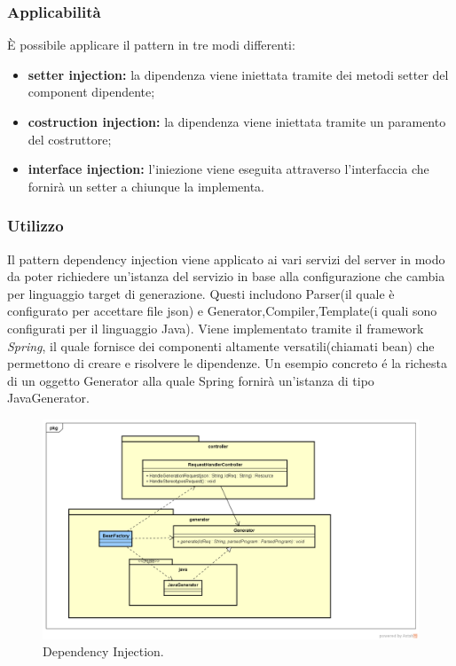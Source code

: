 \subsubsection{Applicabilità} È possibile applicare il pattern in tre modi differenti:
\begin{itemize}
	\item \textbf{setter injection:} la dipendenza viene iniettata tramite dei metodi setter del component dipendente;
	\item \textbf{costruction injection:} la dipendenza viene iniettata tramite un paramento del costruttore;
	\item \textbf{interface injection:} l'iniezione viene eseguita attraverso l'interfaccia che fornirà un setter a chiunque la implementa.
\end{itemize}

\subsubsection{Utilizzo}
Il pattern dependency injection viene applicato ai vari servizi del server in modo da poter richiedere un'istanza del servizio in base alla configurazione che cambia per linguaggio target di generazione.
Questi includono Parser(il quale è configurato per accettare file json) e Generator,Compiler,Template(i quali sono configurati per il linguaggio Java).
Viene implementato tramite il framework \emph{Spring}, il quale fornisce dei componenti altamente versatili(chiamati bean) che permettono di creare e risolvere le dipendenze.
Un esempio concreto é la richesta di un oggetto Generator alla quale Spring fornirà un'istanza di tipo JavaGenerator.

\begin{figure}[H] \label{fig:injector}
	\includegraphics[scale=0.8]{img/depExample.png}
	\caption{Dependency Injection.}
\end{figure}

